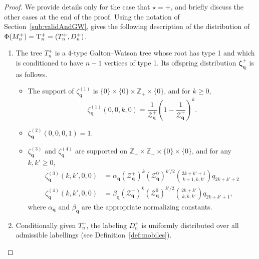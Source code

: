 \documentclass[10pt]{amsart}
\theoremstyle{definition}\newtheorem{defi}[theo]{Definition}\newtheorem{rema}[theo]{Remark}\newtheorem{exam}[theo]{Example}\newtheorem{exem}[theo]{Example}\newtheorem{nota}[theo]{Notation}
\newcommand{\bbZ}{\mathbb{Z}}
\newcommand{\bfq}{\mathbf{q}}
\newcommand{\cZ}{\mathcal{Z}}
\newcommand{\rT}{\mathrm{T}}
\begin{document}
\begin{proof}
We provide details only for the case that $\star=+$, and briefly discuss the other cases at the end of the proof. Using the notation of Section~\ref{sub:validAndGW}, \cite[Proposition~4.6]{CurienLeGallMiermontCactus} gives the following description of the distribution of $\Phi(M_n^+)\linebreak=\rT^+_n=(T^+_n,D^+_n)$.
\begin{enumerate}
\item \label{proofprop4.5.1} The tree $T^+_n$ is a 4-type Galton--Watson tree whose root has type 1 and which is conditioned to have $n-1$ vertices of type 1. Its offspring distribution $\bm{\zeta}^+_{\bfq}$ is as follows.
\begin{itemize}
\item The support of $\zeta^{(1)}_{\bfq}$ is $\{0\}\times\{0\}\times\bbZ_+\times\{0\}$, and for $k\geq 0$,
\[
\zeta^{(1)}_{\bfq}(0,0,k,0)=\frac{1}{\cZ_{\bfq}^+}\left(1-\frac{1}{\cZ_{\bfq}^+}\right)^k.
\]
\item $\zeta^{(2)}_{\bfq}(0,0,0,1)=1$.
\item $\zeta^{(3)}_{\bfq}$ and $\zeta^{(4)}_{\bfq}$ are supported on $\bbZ_+\times\bbZ_+\times\{0\}\times\{0\}$, and for any $k,k'\geq 0$,
\begin{align*}
\zeta^{(3)}_{\bfq}\left(k,k',0,0\right)&=\alpha_{\bfq}\left({\cZ_{\bfq}^+}\right)^k\left({\cZ_{\bfq}^0}\right)^{k'/2}\binom{2k+k'+1}{k+1,k,k'}q_{2k+k'+2}\\
\zeta^{(4)}_{\bfq}(k,k',0,0)&=\beta_{\bfq}\left({\cZ_{\bfq}^+}\right)^k\left({\cZ_{\bfq}^0}\right)^{k'/2}\binom{2k+k'}{k,k,k'}q_{2k+k'+1},
\end{align*}
where $\alpha_{\bfq}$ and $\beta_{\bfq}$ are the appropriate normalizing constants.
\end{itemize}
\item \label{proofprop4.5.2} Conditionally given $T^+_n$, the labeling $D^+_n$ is uniformly distributed over all admissible labellings (see Definition~\ref{def:mobiles}).
\end{enumerate}


\end{proof}
\end{document}
